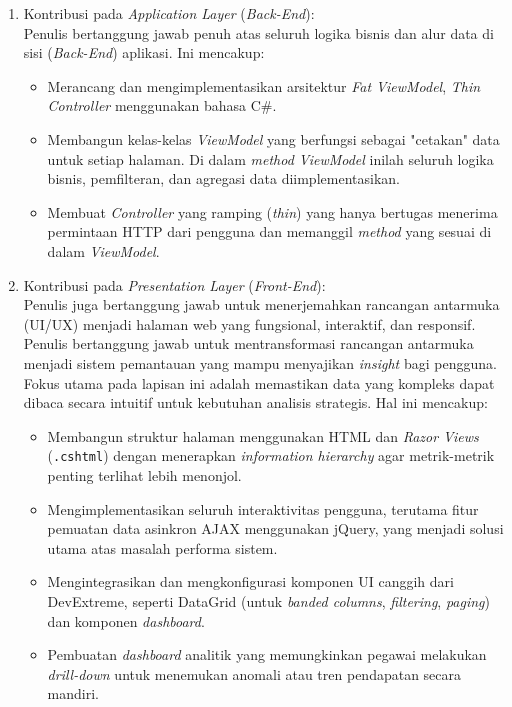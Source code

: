 \begin{enumerate}
    \item Kontribusi pada \emph{Application Layer} (\emph{Back-End}): \\
    Penulis bertanggung jawab penuh atas seluruh logika bisnis dan alur data di sisi (\emph{Back-End}) aplikasi. Ini mencakup:
    \begin{itemize}
        \item Merancang dan mengimplementasikan arsitektur \emph{Fat ViewModel}, \emph{Thin Controller} menggunakan bahasa C\#.
        \item Membangun kelas-kelas \emph{ViewModel} yang berfungsi sebagai "cetakan" data untuk setiap halaman. Di dalam \emph{method ViewModel} inilah seluruh logika bisnis, pemfilteran, dan agregasi data diimplementasikan.
        \item Membuat \emph{Controller} yang ramping (\emph{thin}) yang hanya bertugas menerima permintaan HTTP dari pengguna dan memanggil \emph{method} yang sesuai di dalam \emph{ViewModel}.
    \end{itemize}

    \item Kontribusi pada \emph{Presentation Layer} (\emph{Front-End}): \\
    Penulis juga bertanggung jawab untuk menerjemahkan rancangan antarmuka (UI/UX) menjadi halaman web yang fungsional, interaktif, dan responsif. Penulis bertanggung jawab untuk mentransformasi rancangan antarmuka menjadi sistem pemantauan yang mampu menyajikan \emph{insight} bagi pengguna. Fokus utama pada lapisan ini adalah memastikan data yang kompleks dapat dibaca secara intuitif untuk kebutuhan analisis strategis. Hal ini mencakup:
    \begin{itemize}
        \item Membangun struktur halaman menggunakan HTML dan \emph{Razor Views} (\texttt{.cshtml}) dengan menerapkan \emph{information hierarchy} agar metrik-metrik penting terlihat lebih menonjol.
        \item Mengimplementasikan seluruh interaktivitas pengguna, terutama fitur pemuatan data asinkron AJAX menggunakan jQuery, yang menjadi solusi utama atas masalah performa sistem.
        \item Mengintegrasikan dan mengkonfigurasi komponen UI canggih dari DevExtreme, seperti DataGrid (untuk \emph{banded columns}, \emph{filtering}, \emph{paging}) dan komponen \emph{dashboard}.
        \item Pembuatan \emph{dashboard} analitik yang memungkinkan pegawai melakukan \emph{drill-down} untuk menemukan anomali atau tren pendapatan secara mandiri.
    \end{itemize}
\end{enumerate}

